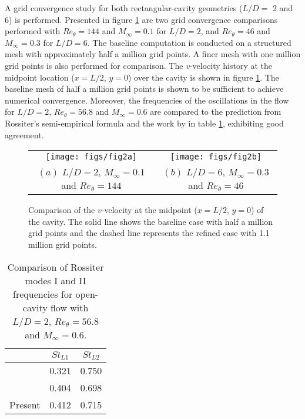 \documentclass{jfm}
\begin{document}
A grid convergence study for both rectangular-cavity geometries ($L/D=$ 2 and 6) is performed. Presented in figure \ref{fig:resolution} are two grid convergence comparisons performed with $Re_\theta=144$ and $M_\infty = 0.1$ for $L/D=2$, and $Re_\theta = 46$ and $M_\infty=0.3$ for $L/D=6$. The baseline computation is conducted on a structured mesh with approximately half a million grid points. A finer mesh with one million grid points is also performed for comparison. The $v$-velocity history at the midpoint location ($x =L/2$, $y = 0$) over the cavity is shown in figure \ref{fig:resolution}. The baseline mesh of half a million grid points is shown to be sufficient to achieve numerical convergence. Moreover, the frequencies of the oscillations in the flow for $L/D=2$, $Re_\theta=56.8$ and $M_\infty=0.6$ are compared to the prediction from Rossiter's semi-empirical formula and the work by \cite{Bres:2007} in table \ref{tableSt_validation}, exhibiting good agreement. 
\begin{figure}
\begin{center}
\begin{tabular}{cc}
   \texttt{[image: figs/fig2a]}&\texttt{[image: figs/fig2b]}\\
   $(a)$ $L/D=2$, $M_\infty=0.1$ and $Re_\theta=144$&$(b)$ $L/D=6$, $M_\infty=0.3$ and $Re_\theta=46$
   \end{tabular}
      \caption{Comparison of the $v$-velocity at the midpoint ($x=L/2$, $y=0$) of the cavity. The solid line shows the baseline case with half a million grid points and the dashed line represents the refined case with 1.1 million grid points.}
   \label{fig:resolution}
\end{center}
\end{figure}

\begin{table}
\begin{center}
\begin{tabular}
      {l c c}  
                      					& $St_{L1}$	& $St_{L2}$  \\ \hline
            \cite{Rossiter:ARCRM64} 	& 0.321  	& 0.750 \\  
            \cite{Bres:2007} 			& 0.404  	& 0.698   \\ 
            Present					& 0.412	& 0.715 \\
\end{tabular}
\end{center}
\caption{Comparison of Rossiter modes I and II frequencies for open-cavity flow with $L/D=2$, $Re_\theta = 56.8$ and $M_\infty=0.6$.}
\label{tableSt_validation}
\end{table} 
\end{document}

